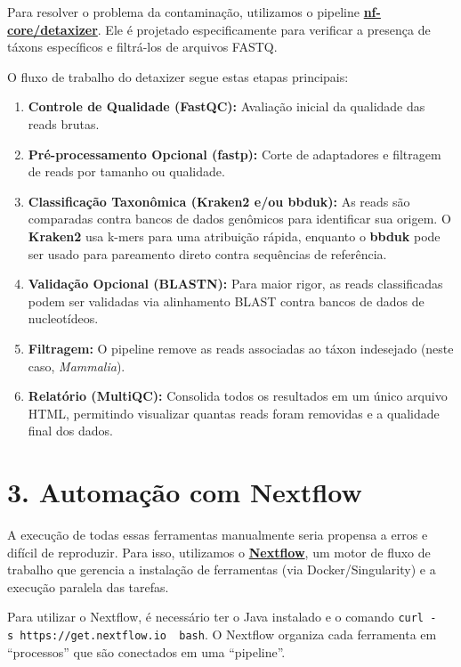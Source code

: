\documentclass[
  letterpaper,
  DIV=11,
  numbers=noendperiod]{scrreprt}
\providecommand{\tightlist}{%
  \setlength{\itemsep}{0pt}\setlength{\parskip}{0pt}}
\begin{document}
Para resolver o problema da contaminação, utilizamos o pipeline
\href{https://nf-co.re/detaxizer/}{\textbf{nf-core/detaxizer}}. Ele é
projetado especificamente para verificar a presença de táxons
específicos e filtrá-los de arquivos FASTQ.

O fluxo de trabalho do detaxizer segue estas etapas principais:

\begin{enumerate}
\def\labelenumi{\arabic{enumi}.}
\tightlist
\item
  \textbf{Controle de Qualidade (FastQC):} Avaliação inicial da
  qualidade das reads brutas.
\item
  \textbf{Pré-processamento Opcional (fastp):} Corte de adaptadores e
  filtragem de reads por tamanho ou qualidade.
\item
  \textbf{Classificação Taxonômica (Kraken2 e/ou bbduk):} As reads são
  comparadas contra bancos de dados genômicos para identificar sua
  origem. O \textbf{Kraken2} usa k-mers para uma atribuição rápida,
  enquanto o \textbf{bbduk} pode ser usado para pareamento direto contra
  sequências de referência.
\item
  \textbf{Validação Opcional (BLASTN):} Para maior rigor, as reads
  classificadas podem ser validadas via alinhamento BLAST contra bancos
  de dados de nucleotídeos.
\item
  \textbf{Filtragem:} O pipeline remove as reads associadas ao táxon
  indesejado (neste caso, \emph{Mammalia}).
\item
  \textbf{Relatório (MultiQC):} Consolida todos os resultados em um
  único arquivo HTML, permitindo visualizar quantas reads foram
  removidas e a qualidade final dos dados.
\end{enumerate}

\section{3. Automação com Nextflow}\label{automauxe7uxe3o-com-nextflow}

A execução de todas essas ferramentas manualmente seria propensa a erros
e difícil de reproduzir. Para isso, utilizamos o
\href{https://nextflow.io/}{\textbf{Nextflow}}, um motor de fluxo de
trabalho que gerencia a instalação de ferramentas (via
Docker/Singularity) e a execução paralela das tarefas.

\begin{tcolorbox}[enhanced jigsaw, arc=.35mm, colframe=quarto-callout-note-color-frame, breakable, bottomrule=.15mm, colback=white, left=2mm, titlerule=0mm, opacityback=0, title=\textcolor{quarto-callout-note-color}{\faInfo}\hspace{0.5em}{Ponto Importante}, leftrule=.75mm, colbacktitle=quarto-callout-note-color!10!white, bottomtitle=1mm, toprule=.15mm, toptitle=1mm, rightrule=.15mm, opacitybacktitle=0.6, coltitle=black]

Para utilizar o Nextflow, é necessário ter o Java instalado e o comando
\texttt{curl\ -s\ https://get.nextflow.io\ \textbar{}\ bash}. O Nextflow
organiza cada ferramenta em ``processos'' que são conectados em uma
``pipeline''.

\end{tcolorbox}
\end{document}
